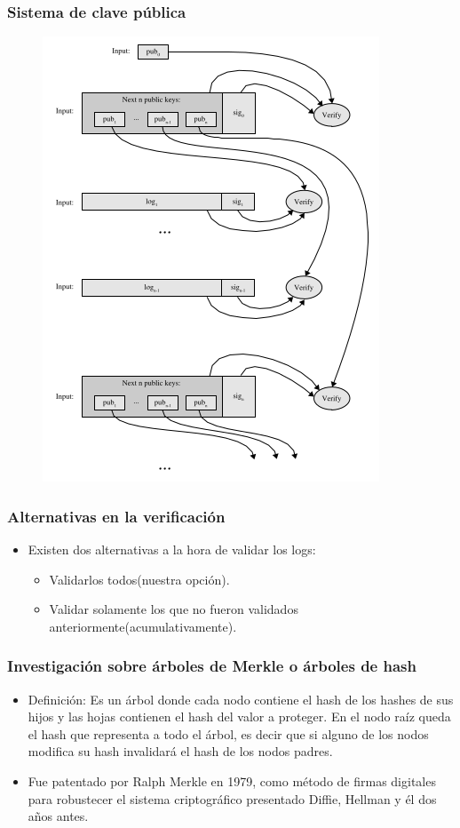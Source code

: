 \documentclass[10pt, a4paper,english,spanish]{beamer}
\begin{document}
\begin{frame}
\frametitle{Sistema de clave pública}
\begin{figure}
  \includegraphics[scale=0.4]{imagenes/PublicKeyVerification.png}
\end{figure}
\end{frame}

\begin{frame}
\frametitle{Alternativas en la verificación}
\begin{itemize}
\item Existen dos alternativas a la hora de validar los logs:
\begin{itemize}
\item Validarlos todos(nuestra opción).
\item Validar solamente los que no fueron validados anteriormente(acumulativamente).
\end{itemize}
\end{itemize}
\end{frame}


\begin{frame}
\frametitle{Investigaci\'on sobre \'arboles de Merkle o \'arboles de hash}
\begin{itemize}

\item Definici\'on: Es un \'arbol donde cada nodo contiene el hash de los hashes de sus hijos y las hojas contienen el hash del valor a proteger. En el nodo ra\'iz queda el hash que representa a todo el \'arbol, es decir que si alguno de los nodos modifica su hash invalidar\'a el hash de los nodos padres.
\item Fue patentado por Ralph Merkle en 1979, como m\'etodo de firmas digitales para robustecer el sistema criptogr\'afico presentado Diffie, Hellman y \'el dos a\~nos antes.

\end{itemize}
\end{frame}
\end{document}
